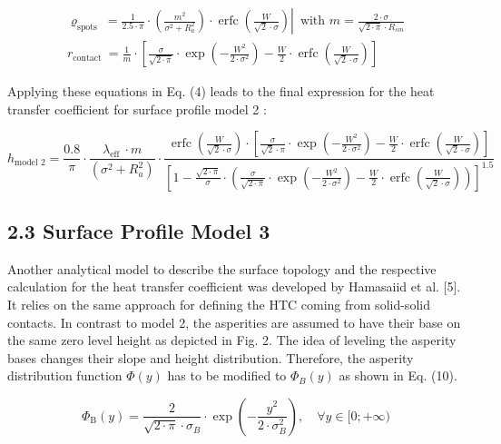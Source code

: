 \documentclass[10pt]{article}
\begin{document}
\begin{gather*}
\left.\varrho_{\text {spots }}=\frac{1}{2.5 \cdot \pi} \cdot\left(\frac{m^{2}}{\sigma^{2}+R_{a}^{2}}\right) \cdot \operatorname{erfc}\left(\frac{W}{\sqrt{2} \cdot \sigma}\right) \right\rvert\, \text { with } m=\frac{2 \cdot \sigma}{\sqrt{2 \cdot \pi} \cdot R_{s m}}  \tag{7}\\
r_{\text {contact }}=\frac{1}{m} \cdot\left[\frac{\sigma}{\sqrt{2 \cdot \pi}} \cdot \exp \left(-\frac{W^{2}}{2 \cdot \sigma^{2}}\right)-\frac{W}{2} \cdot \operatorname{erfc}\left(\frac{W}{\sqrt{2} \cdot \sigma}\right)\right] \tag{8}
\end{gather*}


Applying these equations in Eq. (4) leads to the final expression for the heat transfer coefficient for surface profile model 2 :


\begin{equation*}
h_{\text {model } 2}=\frac{0.8}{\pi} \cdot \frac{\lambda_{\text {eff }} \cdot m}{\left(\sigma^{2}+R_{a}^{2}\right)} \cdot \frac{\operatorname{erfc}\left(\frac{W}{\sqrt{2} \cdot \sigma}\right) \cdot\left[\frac{\sigma}{\sqrt{2} \cdot \pi} \cdot \exp \left(-\frac{W^{2}}{2 \cdot \sigma^{2}}\right)-\frac{W}{2} \cdot \operatorname{erfc}\left(\frac{W}{\sqrt{2} \cdot \sigma}\right)\right]}{\left[1-\frac{\sqrt{2 \cdot \pi}}{\sigma} \cdot\left(\frac{\sigma}{\sqrt{2 \cdot \pi}} \cdot \exp \left(-\frac{W^{2}}{2 \cdot \sigma^{2}}\right)-\frac{W}{2} \cdot \operatorname{erfc}\left(\frac{W}{\sqrt{2} \cdot \sigma}\right)\right)\right]^{1.5}} \tag{9}
\end{equation*}


\subsection*{2.3 Surface Profile Model 3}
Another analytical model to describe the surface topology and the respective calculation for the heat transfer coefficient was developed by Hamasaiid et al. [5]. It relies on the same approach for defining the HTC coming from solid-solid contacts. In contrast to model 2, the asperities are assumed to have their base on the same zero level height as depicted in Fig. 2. The idea of leveling the asperity bases changes their slope and height distribution. Therefore, the asperity distribution function $\Phi(y)$ has to be modified to $\Phi_{B}(y)$ as shown in Eq. (10).


\begin{equation*}
\Phi_{\mathrm{B}}(y)=\frac{2}{\sqrt{2 \cdot \pi} \cdot \sigma_{B}} \cdot \exp \left(-\frac{y^{2}}{2 \cdot \sigma_{B}^{2}}\right), \quad \forall y \in[0 ;+\infty) \tag{10}
\end{equation*}
\end{document}
